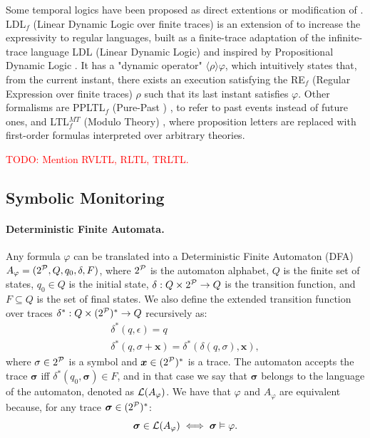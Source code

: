Some temporal logics have been proposed as direct extentions or modification of \ltlf. LDL$_f$ (Linear Dynamic Logic over finite traces) \cite{de2013linear,GiacomoV15} is an extension of \ltlf to increase the expressivity to regular languages, built as a finite-trace adaptation of the infinite-trace language LDL (Linear Dynamic Logic) \cite{vardi2011rise} and inspired by  Propositional Dynamic Logic \cite{fischer1979propositional,harel2000dynamic}. It has a "dynamic operator" $\langle \rho \rangle \varphi$, which intuitively states that, from the current instant, there exists an execution satisfying the RE$_f$ (Regular Expression over finite traces) \cite{hopcroft2001introduction,khoussainov2012automata} $\rho$ such that its last instant satisfies $\varphi$. Other formalisms are PPLTL$_f$ (Pure-Past \ltlf) \cite{de2020pure}, to refer to past events instead of future ones, and LTL$_f^{MT}$ (\ltlf Modulo Theory) \cite{geatti2022linear}, where proposition letters are replaced with first-order formulas interpreted over arbitrary theories.

\noindent
\textcolor{red}{TODO: Mention RVLTL, RLTL, TRLTL.}

\subsection{Symbolic Monitoring}
\label{sec:symbolic}

\paragraph{Deterministic Finite Automata.}
Any \ltlf formula $\varphi$ can be translated into a Deterministic Finite Automaton (DFA) \cite{LTLf} $A_\varphi = (2^{\mathcal{P}}, Q, q_0, \delta, F)$, where $2^{\mathcal{P}}$ is the automaton alphabet, $Q$ is the finite set of states, $q_0 \in Q$ is the initial state, $\delta: Q \times 2^{\mathcal{P}} \rightarrow Q$ is the transition function, and $F \subseteq Q$ is the set of final states. 
We also define the extended transition function over traces $\delta^*: Q \times (2^{\mathcal{P}})^* \rightarrow Q$ recursively as:
\begin{equation}
\begin{array}{l}
\delta^*(q,\epsilon) = q \\
\delta^*(q, \sigma+\boldsymbol{x}) = \delta^*(\delta(q,\sigma) , \boldsymbol{x}),
\end{array}
\end{equation}
where $\sigma \in 2^{\mathcal{P}}$ is a symbol and $\boldsymbol{x} \in (2^{\mathcal{P}})^*$ is a trace.  
The automaton accepts the trace $\boldsymbol{\sigma}$ iff $\delta^*(q_0, \boldsymbol{\sigma}) \in F$, and in that case we say that $\boldsymbol{\sigma}$ belongs to the language of the automaton, denoted as ${\mathcal{L}}(A_\varphi)$.  
We have that $\varphi$ and $A_\varphi$ are equivalent because, for any trace $\boldsymbol{\sigma} \in (2^{\mathcal{P}})^*$:
\begin{equation}
\boldsymbol{\sigma}\in {\ensuremath{\mathcal{L}}}(A_\varphi) \iff\boldsymbol{\sigma}\vDash\varphi.
\end{equation}

